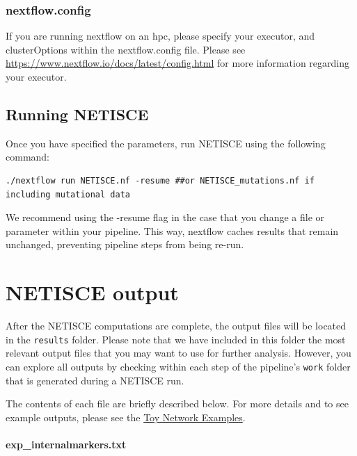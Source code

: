 \documentclass[
]{book}
\begin{document}
\hypertarget{nextflow.config}{%
\subsection{nextflow.config}\label{nextflow.config}}

If you are running nextflow on an hpc, please specify your executor, and clusterOptions within the nextflow.config file. Please see \url{https://www.nextflow.io/docs/latest/config.html} for more information regarding your executor.

\hypertarget{running-netisce}{%
\section{Running NETISCE}\label{running-netisce}}

Once you have specified the parameters, run NETISCE using the following command:

\begin{verbatim}
./nextflow run NETISCE.nf -resume ##or NETISCE_mutations.nf if including mutational data
\end{verbatim}

We recommend using the -resume flag in the case that you change a file or parameter within your pipeline. This way, nextflow caches results that remain unchanged, preventing pipeline steps from being re-run.

\hypertarget{netisce-output}{%
\chapter{NETISCE output}\label{netisce-output}}

After the NETISCE computations are complete, the output files will be located in the \texttt{results} folder. Please note that we have included in this folder the most relevant output files that you may want to use for further analysis. However, you can explore all outputs by checking within each step of the pipeline's \texttt{work} folder that is generated during a NETISCE run.

The contents of each file are briefly described below. For more details and to see example outputs, please see the \protect\hyperlink{toy}{Toy Network Examples}.

\hypertarget{section-id}{%
\subsubsection*{exp\_internalmarkers.txt}\label{section-id}}
\end{document}
